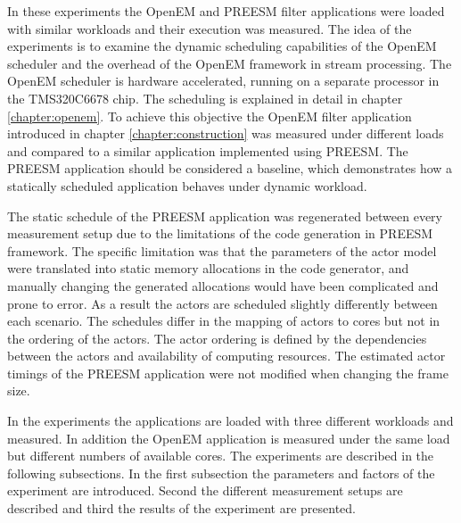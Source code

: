 In these experiments the OpenEM and PREESM filter applications were loaded with similar workloads and their execution was measured. The idea of the experiments is to examine the dynamic scheduling capabilities of the OpenEM scheduler and the overhead of the OpenEM framework in stream processing. The OpenEM scheduler is hardware accelerated, running on a separate processor in the TMS320C6678 chip. The scheduling is explained in detail in chapter \ref{chapter:openem}. To achieve this objective the OpenEM filter application introduced in chapter \ref{chapter:construction} was measured under different loads and compared to a similar application implemented using PREESM. The PREESM application should be considered a baseline, which demonstrates how a statically scheduled application behaves under dynamic workload.

The static schedule of the PREESM application was regenerated between every measurement setup due to the limitations of the code generation in PREESM framework. The specific limitation was that the parameters of the actor model were translated into static memory allocations in the code generator, and manually changing the generated allocations would have been complicated and prone to error. As a result the actors are scheduled slightly differently between each scenario. The schedules differ in the mapping of actors to cores but not in the ordering of the actors. The actor ordering is defined by the dependencies between the actors and availability of computing resources. The estimated actor timings of the PREESM application were not modified when changing the frame size.

In the experiments the applications are loaded with three different workloads and measured. In addition the OpenEM application is measured under the same load but different numbers of available cores. The experiments are described in the following subsections. In the first subsection the parameters and factors of the experiment are introduced. Second the different measurement setups are described and third the results of the experiment are presented.
